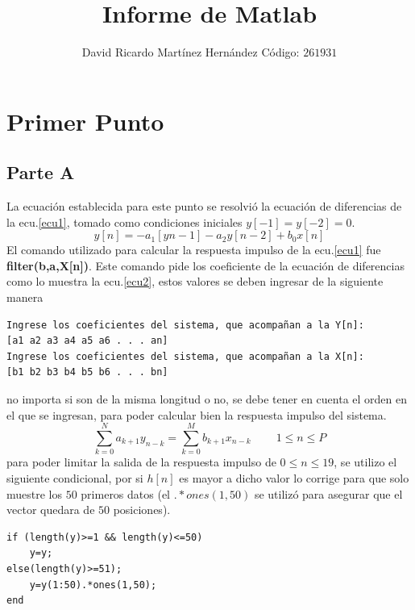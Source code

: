 \documentclass[onecolumn]{IEEEtran}
\begin{document}
\title{Informe de Matlab}
\author{David Ricardo Martínez Hernández Código: $261931$}
\maketitle
{}
\section{Primer Punto}
\subsection{Parte A}
\noindent
La ecuación establecida para este punto se resolvió la ecuación de diferencias de la ecu.\ref{ecu1}, tomado como condiciones iniciales $y\left[ -1 \right]=y\left[ -2 \right]=0$.
\begin{equation}\label{ecu1}
y\left[ n \right] =  - a_1 \left[ {yn - 1} \right] - a_2 y\left[ {n - 2} \right] + b_0 x\left[ n \right]
\end{equation}
\noindent
El comando utilizado para calcular la respuesta impulso de la ecu.\ref{ecu1} fue \textbf{filter(b,a,X[n])}. Este comando pide los coeficiente de la ecuación de diferencias como lo muestra la ecu.\ref{ecu2}, estos valores se deben ingresar de la siguiente manera
\begin{verbatim}
Ingrese los coeficientes del sistema, que acompañan a la Y[n]:
[a1 a2 a3 a4 a5 a6 . . . an]
Ingrese los coeficientes del sistema, que acompañan a la X[n]:
[b1 b2 b3 b4 b5 b6 . . . bn]
\end{verbatim}
\noindent
no importa si son de la misma longitud o no, se debe tener en cuenta el orden en el que se ingresan, para poder calcular bien la respuesta impulso del sistema.
\begin{equation}\label{ecu2}
    \sum\limits_{k = 0}^N {a_{k + 1} y_{n - k}  = \sum\limits_{k = 0}^M {b_{k + 1} x_{n - k} \ \ \ \ \ \ \ \ \ \ 1 \le n \le P} }
\end{equation}
para poder limitar la salida de la respuesta impulso de $0 \le n \le 19$, se utilizo el siguiente condicional, por si $h[n]$ es mayor a dicho valor lo corrige para que solo muestre los $50$ primeros datos (el $.*ones(1,50)$ se utilizó para asegurar que el vector quedara de $50$ posiciones).
\begin{verbatim}
if (length(y)>=1 && length(y)<=50)
	y=y;
else(length(y)>=51);
    y=y(1:50).*ones(1,50);
end
\end{verbatim}
\end{document}
